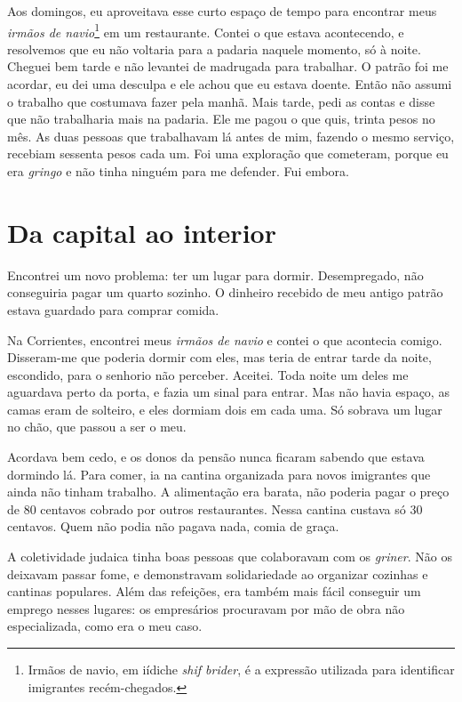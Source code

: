Aos domingos, eu aproveitava esse curto espaço de tempo para encontrar 
meus \textit{irmãos de navio}\footnote{Irmãos de navio, em iídiche \textit{shif brider}, é a expressão utilizada para identificar imigrantes recém-chegados.} em um restaurante. Contei o que estava acontecendo, e resolvemos que eu não voltaria para a padaria naquele
momento, só à noite. Cheguei bem tarde e não levantei de madrugada para
trabalhar. O patrão foi me acordar, eu dei uma desculpa e ele
achou que eu estava doente. Então não assumi o trabalho que costumava fazer
pela manhã. Mais tarde, pedi as contas e disse que não trabalharia mais na
padaria. Ele me pagou o que quis, trinta pesos no mês. As duas pessoas que
trabalhavam lá antes de mim, fazendo o mesmo serviço, recebiam sessenta pesos cada um. Foi uma
exploração que cometeram, porque eu era \textit{gringo} e não tinha ninguém para me defender. Fui embora.

\chapter{Da capital ao interior}

Encontrei um novo problema: ter um lugar para dormir. 
Desempregado, não conseguiria pagar um quarto sozinho. O dinheiro recebido de meu antigo 
patrão estava guardado para comprar comida.

Na Corrientes, encontrei meus \textit{irmãos de navio} e contei o 
que acontecia comigo. Disseram-me que poderia dormir com eles, mas teria de
entrar tarde da noite, escondido, para o senhorio não perceber. Aceitei. Toda noite um deles me aguardava perto da porta, 
e fazia um sinal para entrar. Mas não havia espaço, as camas
eram de solteiro, e eles dormiam dois em cada uma. Só sobrava um lugar
no chão, que passou a ser o meu.

Acordava bem cedo, e os donos da pensão nunca ficaram sabendo que estava
dormindo lá. Para comer, ia na cantina organizada 
para novos imigrantes que ainda não tinham trabalho. A alimentação 
era barata, não poderia pagar o preço de
80 centavos cobrado por outros restaurantes. Nessa cantina custava só 30
centavos. Quem não podia não pagava nada, comia de graça.

A coletividade judaica tinha boas pessoas que colaboravam com os
\textit{griner}. Não os deixavam passar fome, e demonstravam solidariedade 
ao organizar cozinhas e cantinas populares. Além das refeições, era também mais
fácil conseguir um emprego nesses lugares: os empresários
procuravam por mão de obra não especializada, como era o meu caso.

